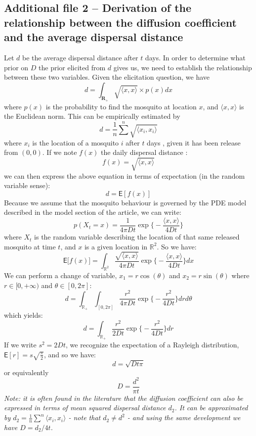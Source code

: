 \documentclass[]{bmcart}
\begin{document}
\begin{backmatter}
\subsection{Additional file 2 -- Derivation of the relationship between the diffusion coefficient and the average dispersal distance}
Let $d$ be the average dispersal distance after $t$ days. In order to determine what prior on $D$ the prior elicited from $d$ gives us, we need to establish the relationship between these two variables. Given the elicitation question, we have 
$$ d = \int_{\mathbf{R}_{+}}  \sqrt{\langle x, x  \rangle} \times p(x) dx$$
where $p(x)$ is the probability to find the mosquito at location $x$, and $\langle x, x  \rangle$ is the Euclidean norm. This can be empirically estimated by 
$$ d = \frac{1}{n}\sum^n  \sqrt{\langle x_i, x_i  \rangle}$$
where $x_i$ is the location of a mosquito $i$ after $t$ days , given it has been release from $(0,0)$. If we note  $f(x)$ the daily dispersal distance :
$$ f(x) = \sqrt{\langle x, x  \rangle} $$
we can then express the above equation in terms of expectation (in the random variable sense): 
$$d = \mathsf{E}[ f(x)]$$ 
 Because we assume that the mosquito behaviour is governed by the PDE model described in the model section of the article, we can write:
$$p(X_t = x) = \frac{1}{4 \pi D t} \exp\Big\{-\frac{\langle x, x  \rangle}{4 D t}\Big\}$$
where $X_t$ is the random variable describing the location of that same released mosquito at time $t$, and $x$ is a given location in $\mathbb{R}^2$. 
So we have:
$$ \mathsf{E} \Big[ f(x) \Big] = \int_{\mathbb{R}^2} \frac{\sqrt{\langle x, x  \rangle}}{4 \pi D t} \exp\Big\{-\frac{\langle x, x  \rangle}{4 D t}\Big\} dx $$
We can perform a change of variable, $x_1 = r \cos(\theta)$ and $x_2 = r \sin(\theta)$ where $r \in [0, +\infty)$ and $\theta \in [0, 2 \pi]$:
$$ d = \int_{\mathbb{R_+}} \int_{[0, 2 \pi]} \frac{r^2}{4 \pi D t} \exp\Big\{-\frac{r^2}{4 D t}\Big\} dr d\theta $$ 
which yields:
$$ d = \int_{\mathbb{R_+}} \frac{r^2}{2 D t} \exp\Big\{-\frac{r^2}{4 D t}\Big\} dr $$
If we write $s^2 = 2 D t$, we recognize the expectation of a Rayleigh distribution, $\mathsf{E}[r] = s \sqrt{\frac{\pi}{2}}$, and so we have:
$$ d = \sqrt{D t \pi } $$ or equivalently
$$D = \frac{d^2}{\pi t}$$
\emph{Note: it is often found in the literature that the diffusion coefficient can also be expressed in terms of mean squared dispersal distance $d_2$. It can be approximated by $d_2 = \frac{1}{n}\sum^n  \langle x_i, x_i  \rangle$  - note that $d_2 \neq d^2$ - and using the same development we have $D = d_2/4 t$.}
\end{backmatter}
\end{document}
